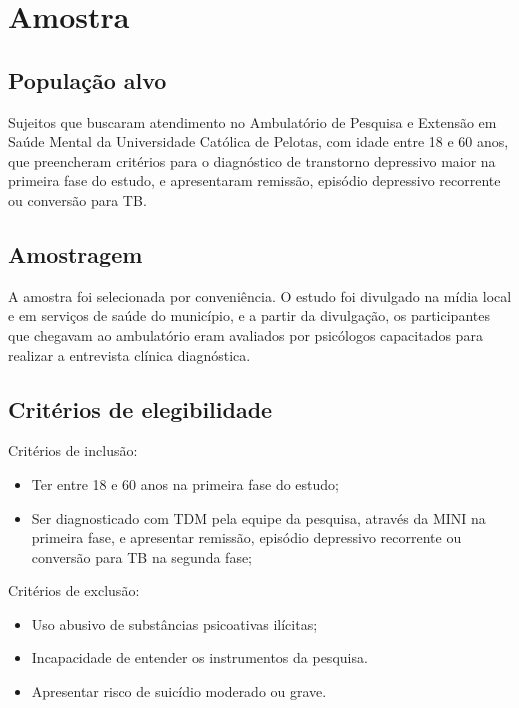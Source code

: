 \documentclass[chapter=TITLE,oneside,12pt,a4paper,english,brazil]{abntex2} %
\begin{document}
\section{Amostra}\label{sec:sujeitos}

    \subsection{População alvo}

    Sujeitos que buscaram atendimento no Ambulatório de Pesquisa e Extensão
    em Saúde Mental da Universidade Católica de Pelotas, com idade entre 18
    e 60 anos, que preencheram critérios para o diagnóstico de transtorno
    depressivo maior na primeira fase do estudo, e apresentaram remissão,
    episódio depressivo recorrente ou conversão para TB.

   \subsection{Amostragem} 
    
    A amostra foi selecionada por conveniência. O estudo foi divulgado na mídia
    local e em serviços de saúde do município, e a partir da divulgação,
    os participantes que chegavam ao ambulatório eram avaliados por psicólogos
    capacitados para realizar a entrevista clínica diagnóstica.

    \subsection{Critérios de elegibilidade}

    Critérios de inclusão:
    \begin{itemize}
        \item Ter entre 18 e 60 anos na primeira fase do estudo;
        \item Ser diagnosticado com TDM pela equipe da pesquisa,
        através da MINI na primeira fase, e apresentar remissão,
        episódio depressivo recorrente ou conversão para TB na segunda fase;
    \end{itemize}

    Critérios de exclusão:
    \begin{itemize}
        \item Uso abusivo de substâncias psicoativas ilícitas;
        \item Incapacidade de entender os instrumentos da pesquisa.
        \item Apresentar risco de suicídio moderado ou grave.
    \end{itemize}
\end{document}
